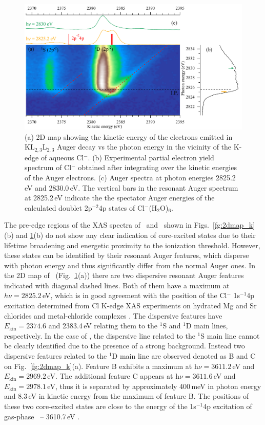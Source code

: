 \begin{figure}[h!]
\centering
\includegraphics[scale=0.55]{figures/cl_2dmap.pdf}
\caption{(a) 2D map showing the kinetic energy of the electrons emitted in KL$_{2,3}$L$_{2,3}$ Auger decay vs the photon energy in the vicinity of the K-edge of aqueous Cl$^{-}$. 
(b) Experimental partial electron yield spectrum of Cl$^{-}$ obtained after integrating over the kinetic energies of the Auger electrons. 
(c) Auger spectra at photon energies 2825.2\,eV and 2830.0\,eV. The vertical bars in the resonant Auger spectrum at 2825.2\,eV indicate the the spectator Auger energies of the calculated doublet 2p$^{-2}$4p states of Cl$^{-}$(H$_2$O)$_6$.}
\label{fg:2dmap_cl}
\end{figure}


The pre-edge regions of the XAS spectra of \ki~and \cli~shown in Figs.\ \ref{fg:2dmap_k}(b) and \ref{fg:2dmap_cl}(b) do not show any clear indication of core-excited states due to their lifetime broadening and energetic proximity to the ionization threshold. However, these states can be identified by their resonant Auger features, which disperse with photon energy and thus significantly differ from the normal Auger ones. In the 2D map of \cli~(Fig.\ \ref{fg:2dmap_cl}(a)) there are two dispersive resonant Auger features indicated with diagonal dashed lines. Both of them have a maximum at $h\nu =  2825.2$\,eV, which is in good agreement with the position of the Cl$^{-}$ 1s$^{-1}$4p excitation determined from Cl K-edge XAS experiments on hydrated Mg and Sr chlorides\citep{sugiura82:681} and metal-chloride complexes \citep{shadle95:2259}. The dispersive features have $E_{\text{kin}} = 2374.6$ and 2383.4\,eV relating them to the $^1$S and $^1$D main lines, respectively. In the case of \ki, the dispersive line related to the $^1$S main line cannot be clearly identified due to the presence of a strong background. Instead two dispersive features related to the $^1$D main line are observed denoted as B and C on Fig.\ \ref{fg:2dmap_k}(a). Feature B exhibits a maximum at h$\nu = 3611.2$\,eV and $E_{\text{kin}} = 2969.2$\,eV. The additional feature C appears at h$\nu = 3611.6$\,eV and $E_{\text{kin}} = 2978.1$\,eV, thus it is separated by approximately 400\,meV in photon energy and 8.3\,eV in kinetic energy from the maximum of feature B. The positions of these two core-excited states are close to the energy of the 1s$^{-1}$4p excitation of gas-phase \ki~-- 3610.7\,eV \citep{hertlein06:062715}.


